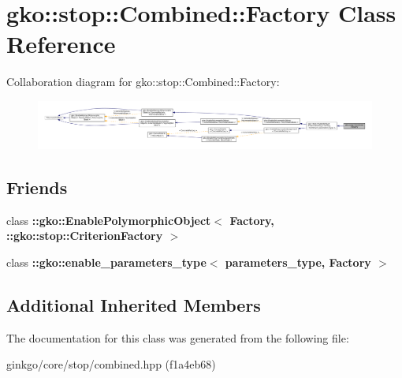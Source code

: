 \hypertarget{classgko_1_1stop_1_1Combined_1_1Factory}{}\section{gko\+:\+:stop\+:\+:Combined\+:\+:Factory Class Reference}
\label{classgko_1_1stop_1_1Combined_1_1Factory}


Collaboration diagram for gko\+:\+:stop\+:\+:Combined\+:\+:Factory\+:
\nopagebreak
\begin{figure}[H]
\begin{center}
\leavevmode
\includegraphics[width=350pt]{classgko_1_1stop_1_1Combined_1_1Factory__coll__graph}
\end{center}
\end{figure}
\subsection*{Friends}
\begin{DoxyCompactItemize}
\item 
\mbox{\label{classgko_1_1stop_1_1Combined_1_1Factory_aaa5507cf00e5361a77971746fefa42e6}} 
class {\bfseries \+::gko\+::\+Enable\+Polymorphic\+Object$<$ Factory, \+::gko\+::stop\+::\+Criterion\+Factory $>$}
\item 
\mbox{\label{classgko_1_1stop_1_1Combined_1_1Factory_a0d176cbd42d6214e11aee8c30ca256fc}} 
class {\bfseries \+::gko\+::enable\+\_\+parameters\+\_\+type$<$ parameters\+\_\+type, Factory $>$}
\end{DoxyCompactItemize}
\subsection*{Additional Inherited Members}


The documentation for this class was generated from the following file\+:\begin{DoxyCompactItemize}
\item 
ginkgo/core/stop/combined.\+hpp (f1a4eb68)\end{DoxyCompactItemize}

